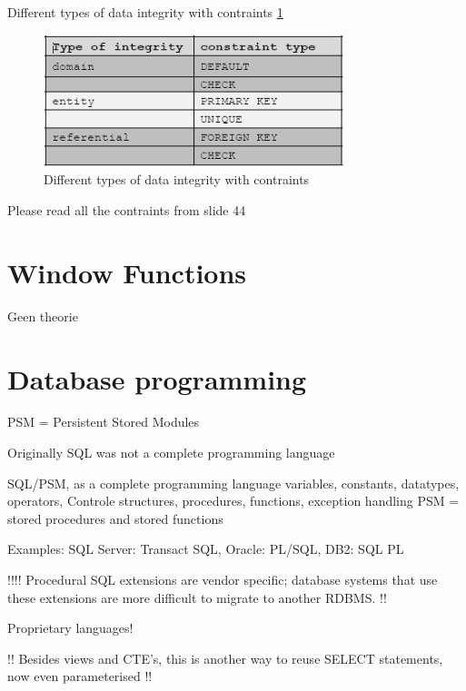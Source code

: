 \documentclass{report}
\begin{document}
        
    Different types of data integrity with contraints \ref{fig:typesItegrity}
    \begin{figure}
        \includegraphics[width=250pt]{./images/typesItegrity.png}
        \caption{\label{fig:typesItegrity}Different types of data integrity with contraints}
    \end{figure}

    Please read all the contraints from slide 44
    
{\let\clearpage\relax \chapter{Window Functions}}

Geen theorie

{\let\clearpage\relax \chapter{Database programming}}
    PSM = Persistent Stored Modules
    
    Originally SQL was not a complete programming language
    
    SQL/PSM, as a complete programming language
    \linebreak
    variables, constants, datatypes, operators, Controle structures, procedures, functions, exception handling
    PSM = stored procedures and stored functions
    
    Examples: SQL Server: Transact SQL, Oracle: PL/SQL, DB2: SQL PL
    
    \bigskip
    \begin{theo}
    !!!! Procedural SQL extensions are vendor specific; database systems that use these extensions are more difficult to migrate to another RDBMS. !!
    \end{theo}
    \bigskip
    Proprietary languages!
    \bigskip
    \begin{theo}
    !! Besides views and CTE's, this is another way to reuse SELECT statements, now even parameterised !!
    \end{theo}
\end{document}

